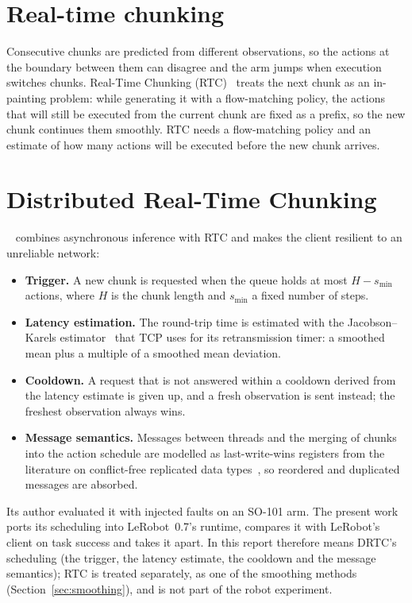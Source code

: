 \section{Real-time chunking}

Consecutive chunks are predicted from different observations, so the actions at the boundary between them can
disagree and the arm jumps when execution switches chunks. Real-Time Chunking (RTC)~\cite{black2025rtc} treats the
next chunk as an in-painting problem: while generating it with a flow-matching policy, the actions that will still be
executed from the current chunk are fixed as a prefix, so the new chunk continues them smoothly. RTC needs a
flow-matching policy and an estimate of how many actions will be executed before the new chunk arrives.


\section{Distributed Real-Time Chunking}\label{sec:bg-drtc}

\drtc~\cite{vial2026drtc} combines asynchronous inference with RTC and makes the client resilient to an unreliable
network:
\begin{itemize}
\item \textbf{Trigger.} A new chunk is requested when the queue holds at most $H-s_{\min}$ actions, where $H$ is the
      chunk length and $s_{\min}$ a fixed number of steps.
\item \textbf{Latency estimation.} The round-trip time is estimated with the Jacobson--Karels
      estimator~\cite{jacobson1988congestion,rfc6298} that TCP uses for its retransmission timer: a smoothed mean
      plus a multiple of a smoothed mean deviation.
\item \textbf{Cooldown.} A request that is not answered within a cooldown derived from the latency estimate is given
      up, and a fresh observation is sent instead; the freshest observation always wins.
\item \textbf{Message semantics.} Messages between threads and the merging of chunks into the action schedule are
      modelled as last-write-wins registers from the literature on conflict-free replicated data
      types~\cite{shapiro2011crdt}, so reordered and duplicated messages are absorbed.
\end{itemize}
Its author evaluated it with injected faults on an SO-101 arm. The present work ports its scheduling into LeRobot~0.7's
runtime, compares it with LeRobot's client on task success and takes it apart. In this report \drtc{} therefore means DRTC's
scheduling (the trigger, the latency estimate, the cooldown and the message semantics); RTC is treated separately, as
one of the smoothing methods (Section~\ref{sec:smoothing}), and is not part of the robot experiment.

